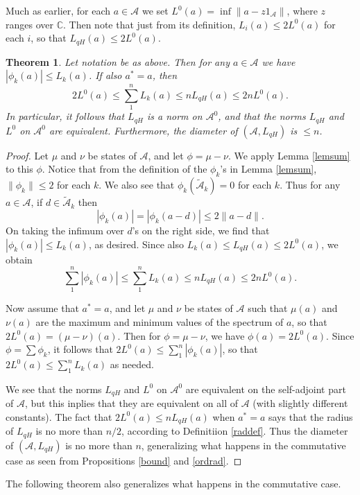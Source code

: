 \documentclass{amsart}[14pt]
\newtheorem{theorem}{Theorem}[section]
\theoremstyle{definition}
\theoremstyle{remark}
\newcommand{\cA}{{\mathcal A}}
\newcommand{\bC}{{\mathbb C}}
\newcommand{\<}{\langle}
\renewcommand{\>}{\rangle}
\numberwithin{equation}{section}
\begin{document}
{Much as earlier, 
for each $a \in \cA$
we set $L^0(a) = \inf \|a - z1_\cA\|$, where 
$z$ ranges over $\bC$. Then note that just from its definition,
$L_i(a) \leq 2L^0(a)$ for each $i$, so that $L_{qH}(a) \leq 2L^0(a)$. 

\begin{theorem}
\label{diamer}
Let notation be as above. Then for any $a \in \cA$ we have
$|\phi_k(a)| \leq  L_k(a)$. If also $a^* = a$, then
\[
2L^0(a) \leq \sum_1^n L_k(a) \leq nL_{qH}(a)  \leq  2nL^0(a).
\]
In particular, it follows that $L_{qH}$ is a norm on $\cA^0$,  
and that the norms $L_{qH}$ and $L^0$ on $\cA^0$
are equivalent. Furthermore, the diameter of $(\cA, L_{qH})$ is
$\leq n$. 
\end{theorem}

\begin{proof}
Let $\mu$ and $\nu$ be states of $\cA$, and let
$\phi = \mu - \nu$. We apply Lemma \ref{lemsum}
to this $\phi$.
Notice that from the definition of the $\phi_k$'s in
Lemma \ref{lemsum}, $\|\phi_k\| \leq 2$ for each $k$.
We also see that
$\phi_k(\tilde \cA_k) = 0$ for each $k$.
Thus for any $a \in \cA$, if $d \in \tilde \cA_k$ then
\[
|\phi_k(a)| = |\phi_k(a-d)| \leq 2\|a-d\|  .
\]
On taking the infimum over $d$'s on the right side, we find that
$|\phi_k(a)|  \leq L_k(a)$, as desired.
Since also $L_k(a) \leq L_{qH}(a) \leq 2L^0(a)$, we obtain
\[
 \sum_1^n |\phi_k(a)| \leq   \sum_1^n L_k(a) \leq n L_{qH}(a) \leq 2nL^0(a).
\]

\noindent
Now assume that $a^* = a$, and let $\mu$ and $\nu$ 
be states of $\cA$ such that $\mu(a)$
and $\nu(a)$ are the maximum and minimum values of
the spectrum of $a$, so that $2L^0(a) = (\mu - \nu)(a)$. 
Then for $\phi = \mu - \nu$, we
have $\phi(a) = 2L^0(a)$. Since $\phi = \sum \phi_k$, it
follows that  $2L^0(a) \leq  \sum_1^n |\phi_k(a)| $, 
so that $2L^0(a) \leq  \sum_1^n L_k(a)$
as needed.

\noindent
We see that the norms $L_{qH}$ and $L^0$ on $\cA^0$
are equivalent on the self-adjoint part of $\cA$, but this inplies
that they are equivalent on all of $\cA$ (with slightly different
constants). The fact that $2L^0(a) \leq nL_{qH}(a)$ when $a^* = a$
says that the radius of $L_{qH}$ is no more than $n/2$, 
according to Definitiion \ref{raddef}. Thus
the diameter of $(\cA, L_{qH})$ is no more than $n$, generalizing what
happens in the commutative case as seen from Propositions
\ref{bound} and \ref{ordrad}.  
\end{proof}

The following theorem also generalizes what 
happens in the commutative case.

}
\end{document}
